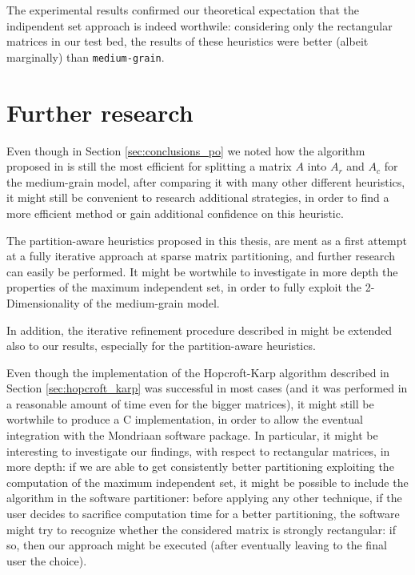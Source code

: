 The experimental results confirmed our theoretical expectation that the indipendent set approach is indeed worthwile: considering only the rectangular matrices in our test bed, the results of these heuristics were better (albeit marginally) than \verb|medium-grain|.

\section{Further research}

Even though in Section \ref{sec:conclusions_po} we noted how the algorithm proposed in \cite{mediumgrain} is still the most efficient for splitting a matrix $A$ into $A_r$ and $A_c$ for the medium-grain model, after comparing it with many other different heuristics, it might still be convenient to research additional strategies, in order to find a more efficient method or gain additional confidence on this heuristic.

The partition-aware heuristics proposed in this thesis, are ment as a first attempt at a fully iterative approach at sparse matrix partitioning, and further research can easily be performed. It might be wortwhile to investigate in more depth the properties of the maximum independent set, in order to fully exploit the 2-Dimensionality of the medium-grain model.

In addition, the iterative refinement procedure described in \cite{mondriaan} might be extended also to our results, especially for the partition-aware heuristics.

Even though the implementation of the Hopcroft-Karp algorithm described in Section \ref{sec:hopcroft_karp} was successful in most cases (and it was performed in a reasonable amount of time even for the bigger matrices), it might still be wortwhile to produce a C implementation, in order to allow the eventual integration with the Mondriaan software package. In particular, it might be interesting to investigate our findings, with respect to rectangular matrices, in more depth: if we are able to get consistently better partitioning exploiting the computation of the maximum independent set, it might be possible to include the algorithm in the software partitioner: before applying any other technique, if the user decides to sacrifice computation time for a better partitioning, the software might try to recognize whether the considered matrix is strongly rectangular: if so, then our approach might be executed (after eventually leaving to the final user the choice).

